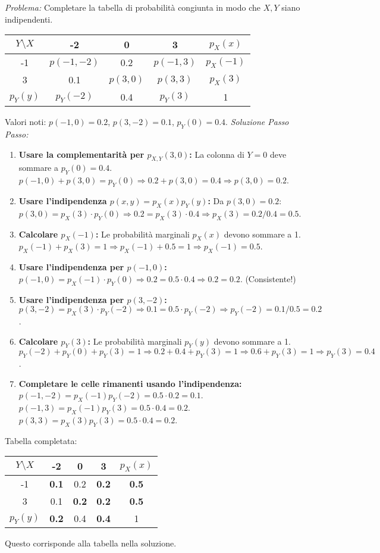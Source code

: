 \documentclass[12pt,a4paper]{article}
\begin{document}
\begin{example}
\begin{example}
\textit{Problema:} Completare la tabella di probabilità congiunta in modo che $X, Y$ siano indipendenti.
\begin{center}
\begin{tabular}{c|ccc|c}
$Y \setminus X$ & -2 & 0 & 3 & $p_X(x)$ \\ \hline
-1 & $p(-1,-2)$ & 0.2 & $p(-1,3)$ & $p_X(-1)$ \\
3 & 0.1 & $p(3,0)$ & $p(3,3)$ & $p_X(3)$ \\ \hline
$p_Y(y)$ & $p_Y(-2)$ & 0.4 & $p_Y(3)$ & 1
\end{tabular}
\end{center}
Valori noti: $p(-1,0)=0.2$, $p(3,-2)=0.1$, $p_Y(0)=0.4$.
\textit{Soluzione Passo Passo:}
\begin{enumerate}
    \item \textbf{Usare la complementarità per $p_{X,Y}(3,0)$:}
    La colonna di $Y=0$ deve sommare a $p_Y(0)=0.4$.
    $p(-1,0) + p(3,0) = p_Y(0) \Rightarrow 0.2 + p(3,0) = 0.4 \Rightarrow p(3,0) = 0.2$.
    \item \textbf{Usare l'indipendenza $p(x,y) = p_X(x)p_Y(y)$:}
    Da $p(3,0) = 0.2$: $p(3,0) = p_X(3) \cdot p_Y(0) \Rightarrow 0.2 = p_X(3) \cdot 0.4 \Rightarrow p_X(3) = 0.2/0.4 = 0.5$.
    \item \textbf{Calcolare $p_X(-1)$:}
    Le probabilità marginali $p_X(x)$ devono sommare a 1.
    $p_X(-1) + p_X(3) = 1 \Rightarrow p_X(-1) + 0.5 = 1 \Rightarrow p_X(-1) = 0.5$.
    \item \textbf{Usare l'indipendenza per $p(-1,0)$:}
    $p(-1,0) = p_X(-1) \cdot p_Y(0) \Rightarrow 0.2 = 0.5 \cdot 0.4 \Rightarrow 0.2 = 0.2$. (Consistente!)
    \item \textbf{Usare l'indipendenza per $p(3,-2)$:}
    $p(3,-2) = p_X(3) \cdot p_Y(-2) \Rightarrow 0.1 = 0.5 \cdot p_Y(-2) \Rightarrow p_Y(-2) = 0.1/0.5 = 0.2$.
    \item \textbf{Calcolare $p_Y(3)$:}
    Le probabilità marginali $p_Y(y)$ devono sommare a 1.
    $p_Y(-2) + p_Y(0) + p_Y(3) = 1 \Rightarrow 0.2 + 0.4 + p_Y(3) = 1 \Rightarrow 0.6 + p_Y(3) = 1 \Rightarrow p_Y(3) = 0.4$.
    \item \textbf{Completare le celle rimanenti usando l'indipendenza:}
    $p(-1,-2) = p_X(-1)p_Y(-2) = 0.5 \cdot 0.2 = 0.1$.
    $p(-1,3) = p_X(-1)p_Y(3) = 0.5 \cdot 0.4 = 0.2$.
    $p(3,3) = p_X(3)p_Y(3) = 0.5 \cdot 0.4 = 0.2$.
\end{enumerate}
Tabella completata:
\begin{center}
\begin{tabular}{c|ccc|c}
$Y \setminus X$ & -2 & 0 & 3 & $p_X(x)$ \\ \hline
-1 & \textbf{0.1} & 0.2 & \textbf{0.2} & \textbf{0.5} \\
3 & 0.1 & \textbf{0.2} & \textbf{0.2} & \textbf{0.5} \\ \hline
$p_Y(y)$ & \textbf{0.2} & 0.4 & \textbf{0.4} & 1
\end{tabular}
\end{center}
Questo corrisponde alla tabella nella soluzione.
\end{example}


\end{example}
\end{document}
